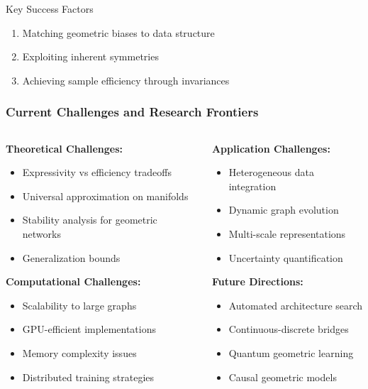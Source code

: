 \begin{frame}[fragile]
\begin{block}{Key Success Factors}
\begin{enumerate}
\item Matching geometric biases to data structure
\item Exploiting inherent symmetries
\item Achieving sample efficiency through invariances
\end{enumerate}
\end{block}

\end{frame}

\begin{frame}[fragile]\frametitle{Current Challenges and Research Frontiers}

\begin{columns}
\begin{column}{0.5\textwidth}
\textbf{Theoretical Challenges:}
\begin{itemize}
\item Expressivity vs efficiency tradeoffs
\item Universal approximation on manifolds
\item Stability analysis for geometric networks
\item Generalization bounds
\end{itemize}

\textbf{Computational Challenges:}
\begin{itemize}
\item Scalability to large graphs
\item GPU-efficient implementations
\item Memory complexity issues
\item Distributed training strategies
\end{itemize}
\end{column}
\begin{column}{0.5\textwidth}
\textbf{Application Challenges:}
\begin{itemize}
\item Heterogeneous data integration
\item Dynamic graph evolution
\item Multi-scale representations
\item Uncertainty quantification
\end{itemize}

\textbf{Future Directions:}
\begin{itemize}
\item Automated architecture search
\item Continuous-discrete bridges
\item Quantum geometric learning
\item Causal geometric models
\end{itemize}
\end{column}
\end{columns}


\end{frame}
